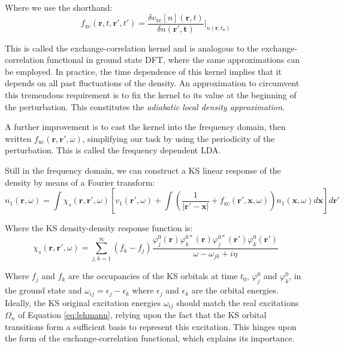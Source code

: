 Where we use the shorthand:
\begin{equation}
    f_{\text{xc}} (\bm{r},t,\bm{r}',t') =\frac{\delta v_{\text{xc}}[n](\bm{r},t)}{\delta n(\bm{r',t})} \Bigr|_{n(\bm{r},t_0)}
\end{equation}

This is called the exchange-correlation kernel and is analogous to the exchange-correlation functional in ground state DFT, where the same approximations can be employed. In practice, the time dependence of this kernel implies that it depends on all past fluctuations of the density. An approximation to circumvent this tremendous requirement is to fix the kernel to its value at the beginning of the perturbation. This constitutes the \textit{adiabatic local density approximation}. 

A further improvement is to cast the kernel into the frequency domain, then written $ f_{\text{xc}}(\bm{r},\bm{r}',\omega)$, simplifying our task by using the periodicity of the perturbation. This is called the frequency dependent LDA.

Still in the frequency domain, we can construct a KS linear response of the density by means of a Fourier transform:
\begin{equation}
    n_1(\bm{r},\omega) = \int \chi_s(\bm{r},\bm{r'},\omega) \left[v_1(\bm{r}',\omega) + \int \left(\frac{1}{|\bm{r}'-\bm{x}|} + f_{\text{xc}}(\bm{r}',\bm{x},\omega) \right) n_1(\bm{x},\omega)d\bm{x}\right] d\bm{r}'
\end{equation}

Where the KS density-density response function is:
\begin{equation}
    \chi_s(\bm{r},\bm{r'},\omega) = \sum_{j,k=1}^{\infty} (f_k - f_j)
    \frac{\varphi^0_j(\bm{r})\varphi^{0*}_k(\bm{r})\varphi^{0*}_j(\bm{r}')\varphi^0_k(\bm{r}')}
    {\omega-\omega_{jk}+i\eta}
\end{equation}

Where $f_j$ and $f_k$ are the occupancies of the KS orbitals at time $t_0$, $\varphi^0_j$ and $\varphi^0_k$, in the ground state and $\omega_{ij}=\epsilon_j - \epsilon_k$ where $\epsilon_j$ and $\epsilon_k$ are the orbital energies. Ideally, the KS original excitation energies $\omega_{ij}$ should match the real excitations $\Omega_n$ of Equation \ref{eq:lehmann}, relying upon the fact that the KS orbital transitions form a sufficient basis to represent this excitation. This hinges upon the form of the exchange-correlation functional, which explains its importance.

